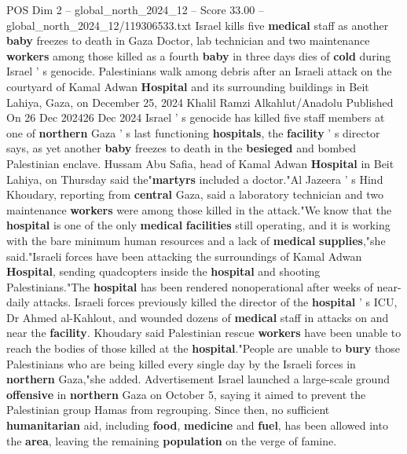 \begin{textsample}{POS Dim 2 – global\_north\_2024\_12 – Score 33.00 – global\_north\_2024\_12/119306533.txt}  \label{ex:f2_pos_183}
Israel kills five \textbf{medical} staff as another \textbf{baby} freezes to death in Gaza Doctor, lab technician and two maintenance \textbf{workers} among those killed as a fourth \textbf{baby} in three days dies of \textbf{cold} during Israel ' s genocide.
Palestinians walk among debris after an Israeli attack on the courtyard of Kamal Adwan \textbf{Hospital} and its surrounding buildings in Beit Lahiya, Gaza, on December 25, 2024 Khalil Ramzi Alkahlut/Anadolu Published On 26 Dec 202426 Dec 2024 Israel ' s genocide has killed five staff members at one of \textbf{northern} Gaza ' s last functioning \textbf{hospitals}, the \textbf{facility} ' s director says, as yet another \textbf{baby} freezes to death in the \textbf{besieged} and bombed Palestinian enclave.
Hussam Abu Safia, head of Kamal Adwan \textbf{Hospital} in Beit Lahiya, on Thursday said the"\textbf{martyrs} included a doctor."Al Jazeera ' s Hind Khoudary, reporting from \textbf{central} Gaza, said a laboratory technician and two maintenance \textbf{workers} were among those killed in the attack."We know that the \textbf{hospital} is one of the only \textbf{medical} \textbf{facilities} still operating, and it is working with the bare minimum human resources and a lack of \textbf{medical} \textbf{supplies},"she said."Israeli forces have been attacking the surroundings of Kamal Adwan \textbf{Hospital}, sending quadcopters inside the \textbf{hospital} and shooting Palestinians."The \textbf{hospital} has been rendered nonoperational after weeks of near-daily attacks.
Israeli forces previously killed the director of the \textbf{hospital} ' s ICU, Dr Ahmed al-Kahlout, and wounded dozens of \textbf{medical} staff in attacks on and near the \textbf{facility}.
Khoudary said Palestinian rescue \textbf{workers} have been unable to reach the bodies of those killed at the \textbf{hospital}."People are unable to \textbf{bury} those Palestinians who are being killed every single day by the Israeli forces in \textbf{northern} Gaza,"she added.
Advertisement Israel launched a large-scale ground \textbf{offensive} in \textbf{northern} Gaza on October 5, saying it aimed to prevent the Palestinian group Hamas from regrouping.
Since then, no sufficient \textbf{humanitarian} aid, including \textbf{food}, \textbf{medicine} and \textbf{fuel}, has been allowed into the \textbf{area}, leaving the remaining \textbf{population} on the verge of famine.

\end{textsample}

